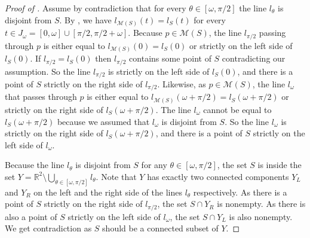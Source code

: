 \begin{proof}[Proof of ]
Assume by contradiction that for every \(\theta \in [\omega, \pi/2]\) the line \(l_\theta\) is disjoint from \(S\). By , we have \(l_{\mathcal{M}(S)}(t) = l_S(t)\) for every \(t \in J_\omega = [0, \omega] \cup [\pi/2, \pi/2 + \omega]\). Because \(p \in \mathcal{M}(S)\), the line \(l_{\pi/2}\) passing through \(p\) is either equal to \(l_{\mathcal{M}(S)}(0) = l_S(0)\) or strictly on the left side of \(l_{S}(0)\). If \(l_{\pi/2} = l_S(0)\) then \(l_{\pi/2}\) contains some point of \(S\) contradicting our assumption. So the line \(l_{\pi/2}\) is strictly on the left side of \(l_{S}(0)\), and there is a point of \(S\) strictly on the right side of \(l_{\pi/2}\). Likewise, as \(p \in \mathcal{M}(S)\), the line \(l_{\omega}\) that passes through \(p\) is either equal to \(l_{\mathcal{M}(S)}(\omega + \pi/2) = l_S(\omega + \pi/2)\) or strictly on the right side of \(l_S(\omega + \pi/2)\). The line \(l_\omega\) cannot be equal to \(l_S(\omega + \pi/2)\) because we assumed that \(l_\omega\) is disjoint from \(S\). So the line \(l_{\omega}\) is strictly on the right side of \(l_S(\omega + \pi/2)\), and there is a point of \(S\) strictly on the left side of \(l_{\omega}\).

Because the line \(l_\theta\) is disjoint from \(S\) for any \(\theta \in [\omega, \pi/2]\), the set \(S\) is inside the set \(Y = \mathbb{R}^2 \setminus \bigcup_{\theta \in [\omega, \pi/2]} l_\theta\). Note that \(Y\) has exactly two connected components \(Y_L\) and \(Y_R\) on the left and the right side of the lines \(l_\theta\) respectively. As there is a point of \(S\) strictly on the right side of \(l_{\pi/2}\), the set \(S \cap Y_R\) is nonempty. As there is also a point of \(S\) strictly on the left side of \(l_\omega\), the set \(S \cap Y_L\) is also nonempty. We get contradiction as \(S\) should be a connected subset of \(Y\).
\end{proof}